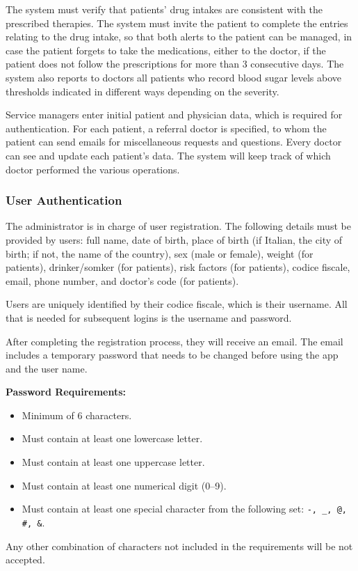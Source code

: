 \documentclass[10pt, titlepage]{article}
\begin{document}
    The system must verify that patients' drug intakes are consistent with the prescribed therapies. The system must invite the patient to complete the entries relating to the drug intake, so that both alerts to the patient can be managed, in case the patient forgets to take the medications, either to the doctor, if the patient does not follow the prescriptions for more than 3 consecutive days. The system also reports to doctors all patients who record blood sugar levels above thresholds indicated in different ways depending on the severity. 

    Service managers enter initial patient and physician data, which is required for authentication. For each patient, a referral doctor is specified, to whom the patient can send emails for miscellaneous requests and questions. Every doctor can see and update each patient's data. The system will keep track of which doctor performed the various operations.
    
    \subsubsection{User Authentication}
    The administrator is in charge of user registration. The following details must be provided by users: full name, date of birth, place of birth (if Italian, the city of birth; if not, the name of the country), sex (male or female), weight (for patients), drinker/somker (for patients), risk factors (for patients), codice fiscale, email, phone number, and doctor's code (for patients). 
    
    Users are uniquely identified by their codice fiscale, which is their username. All that is needed for subsequent logins is the username and password.
    
    After completing the registration process, they will receive an email. The email includes a temporary password that needs to be changed before using the app and the user name.
    
    \textbf{Password Requirements:}
    \begin{itemize}
        \item Minimum of 6 characters.
        \item Must contain at least one lowercase letter.
        \item Must contain at least one uppercase letter.
        \item Must contain at least one numerical digit (0--9).
        \item Must contain at least one special character from the following set: \texttt{-, \_, @, \#, \&}.
    \end{itemize}
    Any other combination of characters not included in the requirements will be not accepted.
\end{document}
